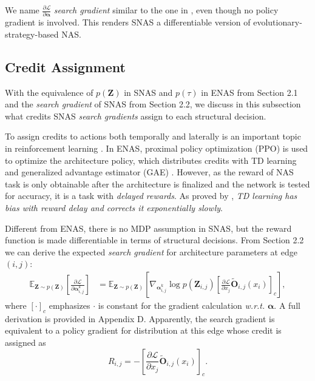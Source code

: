 \documentclass{article} \usepackage{iclr2019_conference,times}
\newcommand{\zh}{\color{black}}
\begin{document}
We name $\frac{\partial \mathcal{L}}{\partial \bm{\alpha}}$ \textit{search gradient} similar {\zh to} the one in \citet{wierstra2008natural}, even though no policy gradient is involved. This renders SNAS a differentiable version of evolutionary-strategy-based NAS.

\subsection{Credit Assignment}
With the equivalence of $p(\bm{Z})$ in SNAS and $p(\tau)$ in ENAS from Section 2.1 and the \textit{search gradient} of SNAS from Section 2.2, we discuss in this subsection what credits SNAS \textit{search gradients} assign to each structural decision. 

To assign credits to actions both temporally and laterally is an important topic in reinforcement learning \citep{precup2000eligibility, schulman2015high, tucker2018mirage, xu2018meta}. In ENAS, proximal policy optimization (PPO) \citep{schulman2017proximal} is used to optimize the architecture policy, which distributes credits with TD learning and generalized advantage estimator (GAE) \citep{schulman2015high}. However, as the reward of NAS task is only obtainable after the architecture is finalized and the network is tested for accuracy, it is a task with \textit{delayed rewards}. As proved by \citet{arjona2018rudder}, \textit{TD learning has bias with reward delay and corrects it exponentially slowly}. 

Different from ENAS, there is no MDP assumption in SNAS, but the reward function is made differentiable in terms of structural decisions. From Section 2.2 we can derive the expected \textit{search gradient} for architecture parameters at edge $(i, j)$:
\begin{equation}
\begin{split}
\mathbb{E}_{\bm{Z}\sim p(\bm{Z})}[\frac{\partial \mathcal{L}}{\partial \bm{\alpha}_{i, j}^{k}}] 
&= \mathbb{E}_{\bm{Z}\sim p(\bm{Z})}[\nabla_{\bm{\alpha}_{i, j}^{k}}\log p(\bm{Z}_{i, j})[\frac{\partial \mathcal{L}}{\partial x_{j}}\tilde{\bm{O}}_{i, j}(x_{i})]_{c}],
\end{split}
\end{equation}
where $[\cdot]_{c}$ emphasizes $\cdot$ is constant for the gradient calculation \textit{w.r.t.} $\bm{\alpha}$. A full derivation is provided in Appendix D. Apparently, the search gradient is equivalent to a policy gradient for distribution at this edge whose credit is assigned as 
\begin{equation}
R_{i, j}=-[\frac{\partial \mathcal{L}}{\partial x_{j}}\tilde{\bm{O}}_{i, j}(x_{i})]_{c}.
\label{eq:reward} 
\end{equation}
\end{document}
